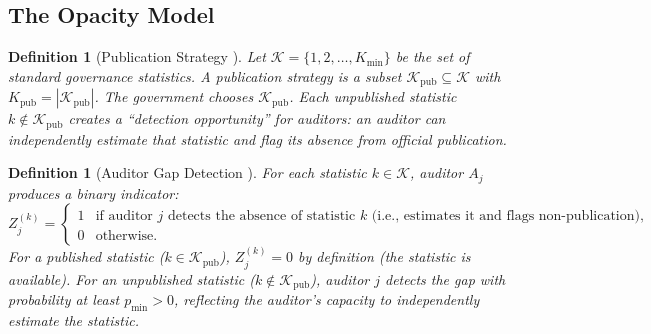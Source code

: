 \documentclass[11pt,a4paper]{article}
\newtheorem{definition}[theorem]{Definition}
\theoremstyle{definition}
\begin{document}
\subsection{The Opacity Model}
\begin{definition}[Publication Strategy ]
\label{def:publication}
Let $\mathcal{K} = \{1, 2, \ldots, K_{\min}\}$ be the set of standard governance statistics. A publication strategy is a subset $\mathcal{K}_{\mathrm{pub}} \subseteq \mathcal{K}$ with $K_{\mathrm{pub}} = |\mathcal{K}_{\mathrm{pub}}|$. The government chooses $\mathcal{K}_{\mathrm{pub}}$. Each unpublished statistic $k \notin \mathcal{K}_{\mathrm{pub}}$ creates a ``detection opportunity'' for auditors: an auditor can independently estimate that statistic and flag its absence from official publication.
\end{definition}
\begin{definition}[Auditor Gap Detection ]
\label{def:gap_detection}
For each statistic $k \in \mathcal{K}$, auditor $A_j$ produces a binary indicator:
\begin{equation}
    Z_j^{(k)} = \begin{cases}
        1 & \text{if auditor $j$ detects the absence of statistic $k$ (i.e., estimates it and flags non-publication),} \\
        0 & \text{otherwise.}
    \end{cases}
    \label{eq:Z_jk}
\end{equation}
For a published statistic ($k \in \mathcal{K}_{\mathrm{pub}}$), $Z_j^{(k)} = 0$ by definition (the statistic is available). For an unpublished statistic ($k \notin \mathcal{K}_{\mathrm{pub}}$), auditor $j$ detects the gap with probability at least $p_{\min} > 0$, reflecting the auditor's capacity to independently estimate the statistic.
\end{definition}
\end{document}
